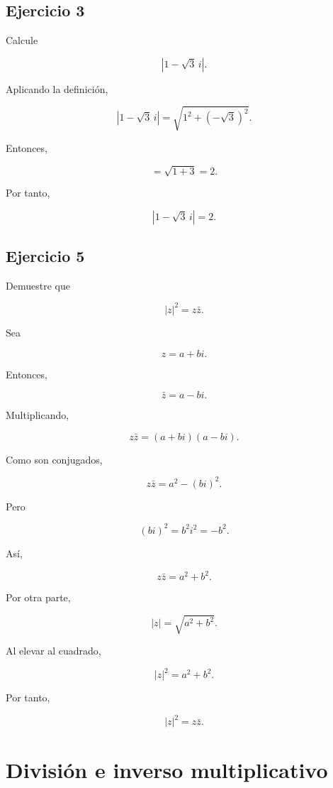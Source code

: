 \documentclass[12pt]{article}
\begin{document}

\subsection*{Ejercicio 3}

Calcule

\[
|1-\sqrt3\,i|.
\]

Aplicando la definición,

\[
|1-\sqrt3\,i|
=
\sqrt{1^2+(-\sqrt3)^2}.
\]

Entonces,

\[
=\sqrt{1+3}
=
2.
\]

Por tanto,

\[
\boxed{|1-\sqrt3\,i|=2}.
\]


\subsection*{Ejercicio 5}

Demuestre que

\[
|z|^2=z\bar z.
\]

Sea

\[
z=a+bi.
\]

Entonces,

\[
\bar z=a-bi.
\]

Multiplicando,

\[
z\bar z
=
(a+bi)(a-bi).
\]

Como son conjugados,

\[
z\bar z
=
a^2-(bi)^2.
\]

Pero

\[
(bi)^2=b^2i^2=-b^2.
\]

Así,

\[
z\bar z
=
a^2+b^2.
\]

Por otra parte,

\[
|z|
=
\sqrt{a^2+b^2}.
\]

Al elevar al cuadrado,

\[
|z|^2=a^2+b^2.
\]

Por tanto,

\[
\boxed{|z|^2=z\bar z}.
\]

\section*{División e inverso multiplicativo}
\end{document}
